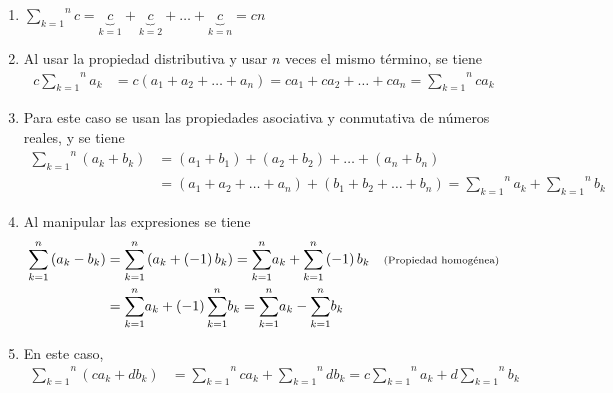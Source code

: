 \begin{enumerate}[leftmargin=1.2em, itemindent=0pt,       labelwidth=\labelwidth, labelsep=0.5em,]

\item $\overset{n}{\underset{k=1}{\sum }}c=\underset{k=1}{\underbrace{c}}+%
\underset{k=2}{\underbrace{c}}+\ldots +\underset{k=n}{\underbrace{c}}=cn$


\item Al usar la propiedad distributiva y usar $n$ veces el mismo término, se tiene
\begin{align*}
c\overset{n}{\underset{k=1}{\sum }}a_{k}&=c\left( a_{1}+a_{2}+\ldots
+a_{n}\right)%
=ca_{1}+ca_{2}+\ldots +ca_{n}=\overset{n}{\underset{k=1}{\sum }}ca_{k}
\end{align*}

\item Para este caso se usan las propiedades asociativa y conmutativa de números reales, y se tiene
{\footnotesize
\begin{align*}
\overset{n}{\underset{k=1}{\sum }}\left( a_{k}+b_{k}\right)
&=\left(a_{1}+b_{1}\right) +\left( a_{2}+b_{2}\right) +\ldots +\left(
a_{n}+b_{n}\right) \\
&=\left( a_{1}+a_{2}+\ldots +a_{n}\right) +\left(
b_{1}+b_{2}+\ldots +b_{n}\right)=\overset{n}{\underset{k=1}{\sum }}a_{k}+\overset{n}{\underset{k=1}{\sum }}b_{k}
\end{align*}
}

\item Al manipular las expresiones se tiene
{\footnotesize
\begin{align*}
\overset{n}{\underset{k=1}{\sum }}\left( a_{k}-b_{k}\right) &=\overset{n}{ \underset{k=1}{\sum }}\left( a_{k}+\left( -1\right) b_{k}\right)%
=\overset{n}{\underset{k=1}{\sum }}a_{k}+\overset{n}{\underset{k=1}{\sum }}\left( -1\right) b_{k} \text{\quad \scriptsize (Propiedad homogénea)}\\
&=\overset{n}{\underset{k=1}{\sum }}a_{k}+\left(-1\right) \overset{n}{\underset{k=1}{\sum }}b_{k}=\overset{n}{\underset{k=1}{\sum }}a_{k}-\overset{n}{\underset{k=1}{\sum }}b_{k}
\end{align*}
}

\item En este caso,
\begin{align*}
\overset{n}{\underset{k=1}{\sum }}\left( ca_{k}+db_{k}\right) &=\overset{n}{\underset{k=1}{\sum }}ca_{k}+\overset{n}{\underset{k=1}{\sum }}db_{k}=c\overset{n}{\underset{k=1}{\sum }}a_{k}+d\overset{n}{\underset{k=1}{\sum }}b_{k}
\end{align*}


\end{enumerate}
